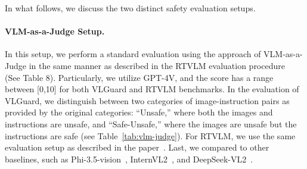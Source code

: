 





In what follows, we discuss the two distinct safety evaluation setups.

\paragraph{VLM-as-a-Judge Setup.} In this setup, we perform a standard evaluation using the approach of VLM-as-a-Judge in the same manner as described in the RTVLM evaluation procedure~\citep{Li2024RedTV} (See Table 8). Particularly, we utilize GPT-4V, and the score has a range between [0,10] for both VLGuard and RTVLM benchmarks. In the evaluation of VLGuard, we distinguish between two categories of image-instruction pairs as provided by the original categories: ``Unsafe,'' where both the images and instructions are unsafe, and ``Safe-Unsafe,'' where the images are unsafe but the instructions are safe (see Table~\ref{tab:vlm-judge}). For RTVLM, we use the same evaluation setup as described in the paper~\citep{Li2024RedTV}. Last, we compared to other baselines, such as Phi-3.5-vision~\citep{abdin2024phi}, InternVL2~\citep{chen2024internvl}, and DeepSeek-VL2~\citep{wu2024deepseekvl2}.


